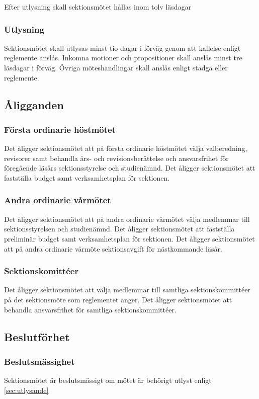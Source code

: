 Efter utlysning skall sektionsmötet hållas inom tolv läsdagar

\subsubsection{Utlysning}
Sektionsmötet skall utlysas minst tio dagar i förväg genom att kallelse enligt reglemente anslås. Inkomna motioner och propositioner skall anslås minst tre läsdagar i förväg. Övriga möteshandlingar skall anslås enligt stadga eller reglemente.

\subsection{Åligganden}

\subsubsection{Första ordinarie höstmötet}
Det åligger sektionsmötet att på första ordinarie höstmötet välja valberedning, revisorer samt behandla års- och revisionsberättelse och ansvarsfrihet för föregående läsårs sektionsstyrelse och studienämnd. Det åligger sektionsmötet att fastställa budget samt verksamhetsplan för sektionen.

\subsubsection{Andra ordinarie vårmötet}
Det åligger sektionsmötet att på andra ordinarie vårmötet välja medlemmar till sektionsstyrelsen och studienämnd. Det åligger sektionsmötet att fastställa preliminär budget samt verksamhetsplan för sektionen. Det åligger sektionsmötet att på andra ordinarie vårmöte sektionsavgift för nästkommande läsår.

\subsubsection{Sektionskomittéer}
Det åligger sektionsmötet att välja medlemmar till samtliga sektionskommittéer på det sektionsmöte som reglementet anger. Det åligger sektionsmötet att behandla ansvarsfrihet för samtliga sektionskommittéer.

\subsection{Beslutförhet}

\subsubsection{Beslutsmässighet}
Sektionsmötet är beslutsmässigt om mötet är behörigt utlyst enligt \ref{sec:utlysande}


